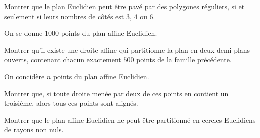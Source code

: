 
\begin{exer}
Montrer que le plan Euclidien peut être pavé par des polygones réguliers, %
si et seulement si leurs nombres de côtés est $3$, $4$ ou $6$.
\end{exer}

\begin{exer}
On se donne $1000$ points du plan affine Euclidien.

Montrer qu'il existe une droite affine qui partitionne la plan en deux demi-plans ouverts, %
contenant chacun exactement $500$ points de la famille précédente.
\end{exer}

\begin{exer}
On concidère $n$ points du plan affine Euclidien.

Montrer que, si toute droite menée par deux de ces points en contient un troisième, alors tous ces points sont alignés.
\end{exer}

\begin{exer}
Montrer que le plan affine Euclidien ne peut être partitionné en cercles Euclidiens de rayons non nuls.
\end{exer}